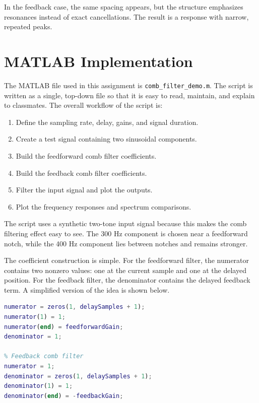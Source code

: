 \documentclass[11pt]{article}
\begin{document}
In the feedback case, the same spacing appears, but the structure emphasizes resonances instead of exact cancellations. The result is a response with narrow, repeated peaks.

\section{MATLAB Implementation}
The MATLAB file used in this assignment is \texttt{comb\_filter\_demo.m}. The script is written as a single, top-down file so that it is easy to read, maintain, and explain to classmates. The overall workflow of the script is:

\begin{enumerate}
    \item Define the sampling rate, delay, gains, and signal duration.
    \item Create a test signal containing two sinusoidal components.
    \item Build the feedforward comb filter coefficients.
    \item Build the feedback comb filter coefficients.
    \item Filter the input signal and plot the outputs.
    \item Plot the frequency responses and spectrum comparisons.
\end{enumerate}

The script uses a synthetic two-tone input signal because this makes the comb filtering effect easy to see. The 300 Hz component is chosen near a feedforward notch, while the 400 Hz component lies between notches and remains stronger.

The coefficient construction is simple. For the feedforward filter, the numerator contains two nonzero values: one at the current sample and one at the delayed position. For the feedback filter, the denominator contains the delayed feedback term. A simplified version of the idea is shown below.

\begin{lstlisting}[language=Matlab, caption={Simplified coefficient construction for the comb filters.}]
% Feedforward comb filter
numerator = zeros(1, delaySamples + 1);
numerator(1) = 1;
numerator(end) = feedforwardGain;
denominator = 1;

% Feedback comb filter
numerator = 1;
denominator = zeros(1, delaySamples + 1);
denominator(1) = 1;
denominator(end) = -feedbackGain;
\end{lstlisting}
\end{document}
